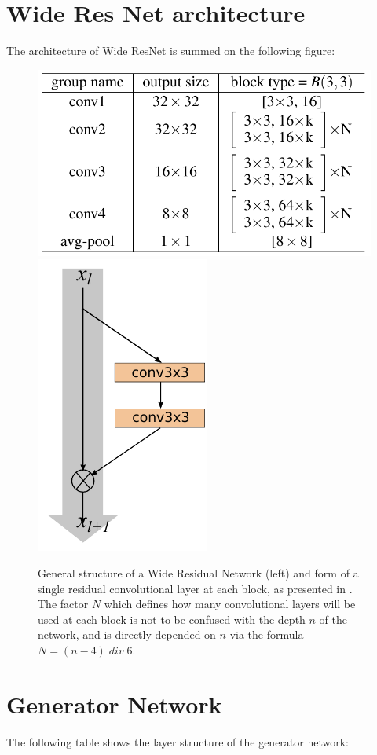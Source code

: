 \appendix
\section{Wide Res Net architecture}
\label{wrn_appendix}
The architecture of Wide ResNet is summed on the following figure:
\begin{figure}[!h]
    \label{WRN-Arch}
    \centering
    \includegraphics[width=0.49\linewidth]{images/wrn_block.png}
    \includegraphics[width=0.165\linewidth]{images/block.png}
    \caption{General structure of a Wide Residual Network (left) and form of a single residual convolutional layer at each block, as presented in \cite{zagoruyko2016paying}. The factor $N$ which defines how many convolutional layers will be used at each block is not to be confused with the depth $n$ of the network, and is directly depended on $n$ via the formula $N =  (n - 4) \; div \;6 $.}
\end{figure}


\section{Generator Network}
\label{gen_lconfig}
The following table shows the layer structure of the generator network:

